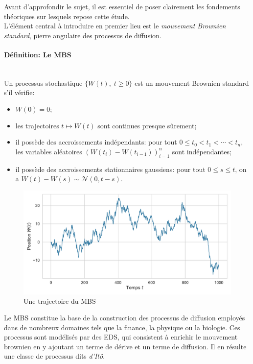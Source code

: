 Avant d'approfondir le sujet, il est essentiel de poser clairement les fondements théoriques sur lesquels repose cette étude.\\
L'élément central à introduire en premier lieu est le \textit{mouvement Brownien standard}, pierre angulaire des processus de diffusion.
\paragraph{Définition: Le \acl{MBS}}\mbox{}\\ 
Un processus stochastique $\{W(t),\;t\geq0\}$ est un mouvement Brownien standard s'il vérifie:
\begin{itemize}
    \item $W(0) = 0$;
    \item les trajectoires $t \mapsto W(t)$ sont continues presque sûrement;
    \item il possède des accroissements indépendants: pour tout $0 \leq t_0 < t_1 < \cdots < t_n$, les variables aléatoires ${\left(W(t_i) - W(t_{i-1})\right)}_{i=1}^n$ sont indépendantes;
    \item il possède des accroissements stationnaires gaussiens: pour tout $0 \leq s \leq t$, on a $W(t) - W(s) \sim \mathcal{N}(0, t - s)$.
\end{itemize}
\begin{figure}[htb]
    \centering
    \includegraphics[width=0.9\linewidth]{img/intro/path_MBS.pdf}
    \caption{Une trajectoire du \acl{MBS}}\label{fig:TrajMBS}
\end{figure}
\FloatBarrier Le \acs{MBS} constitue la base de la construction des processus de diffusion employés dans de nombreux domaines tels que la finance, la physique ou la biologie. Ces processus sont modélisés par des \acf{EDS}, qui consistent à enrichir le mouvement brownien en y ajoutant un terme de dérive et un terme de diffusion. Il en résulte une classe de processus dits \textit{d'Itô}.

